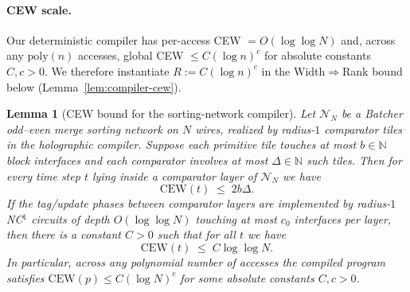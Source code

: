 \documentclass[12pt]{article}
\newtheorem{lemma}[theorem]{Lemma}
\theoremstyle{definition}
\theoremstyle{definition}
\theoremstyle{remark}
\theoremstyle{remark}
\begin{document}
\paragraph{CEW scale.}
Our deterministic compiler has per-access CEW $=O(\log\log N)$ and, across any $\mathrm{poly}(n)$ accesses, global CEW $\le C(\log n)^c$ for absolute constants $C,c>0$. We therefore instantiate $R:=C(\log n)^c$ in the Width$\Rightarrow$Rank bound below (Lemma~\ref{lem:compiler-cew}).

\begin{lemma}[CEW bound for the sorting-network compiler]\label{lem:CEW-logn}\label{lem:compiler-cew}
Let $\mathcal{N}_N$ be a Batcher odd--even merge sorting network on $N$ wires,
realized by radius-$1$ comparator tiles in the holographic compiler. Suppose
each primitive tile touches at most $b \in \mathbb{N}$ block interfaces and
each comparator involves at most $\Delta \in \mathbb{N}$ such tiles. Then for
every time step $t$ lying inside a comparator layer of $\mathcal{N}_N$ we have
\[
  \mathrm{CEW}(t) \;\le\; 2 b \Delta.
\]
If the tag/update phases between comparator layers are implemented by
radius-$1$ NC$^1$ circuits of depth $O(\log\log N)$ touching at most
$c_0$ interfaces per layer, then there is a constant $C>0$ such that for all
$t$ we have
\[
  \mathrm{CEW}(t) \;\le\; C \log\log N.
\]
In particular, across any polynomial number of accesses the compiled program
satisfies $\mathrm{CEW}(p) \le C (\log N)^c$ for some absolute constants
$C,c>0$.
\end{lemma}
\end{document}
